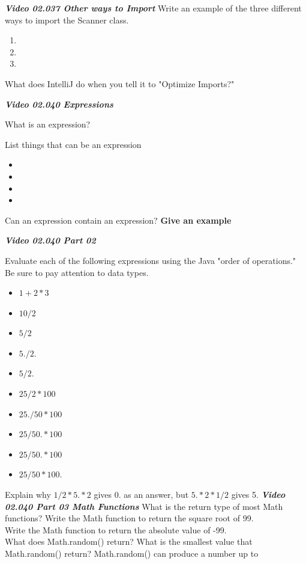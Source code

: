 \documentclass[letterpaper,11pt]{exam}
\newcommand{\videoheading}[1]{\Large\textbf{\textit{#1}}}
\begin{document}
\begin{samepage}
\videoheading{Video 02.037 Other ways to Import}
\question Write an example of the three different ways to import the Scanner class.
\begin{enumerate}
  \item
  \item
  \item
\end{enumerate}
\end{samepage}
\question What does IntelliJ do when you tell it to "Optimize Imports?"
\vspace{1cm}

\videoheading{Video 02.040 Expressions}

\question What is an expression?
\begin{samepage}
\question List things that can be an expression
\begin{itemize}
  \item 
  \item 
  \item 
  \item 
\end{itemize}
\end{samepage}
\question Can an expression contain an expression?  \textbf{Give an example}


\videoheading{Video 02.040 Part 02}
\begin{samepage}
\question Evaluate each of the following expressions using the Java "order of operations."  Be sure to pay attention to data types.
\begin{itemize}
  \item$1+2*3$
  \item$10/2$
  \item $5/2$
  \item $5./2.$
  \item $5/2.$
  \item $25/2*100$
  \item $25./50*100$
  \item $25/50.*100$
  \item $25/50.*100$
  \item $25/50*100.$
\end{itemize}
\end{samepage}
\question Explain why $1/2 * 5. * 2$ gives 0. as an answer, but $5. * 2 * 1/2$ gives 5.
\vspace{1cm}
\videoheading{Video 02.040 Part 03 Math Functions}
\question What is the return type of most Math functions?
\question Write the Math function to return the square root of 99.
\\
\question Write the Math function to return the absolute value of -99.
\\
\question What does Math.random() return?
\question What is the smallest value that Math.random() return?
\question Math.random() can produce a number up to \hrulefill
\end{document}

